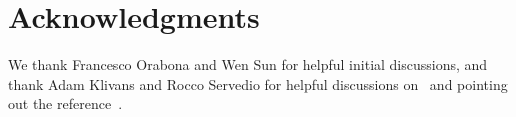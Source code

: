 \documentclass{article}
\begin{document}









%


\onecolumn
\appendix
\clearpage

\section*{Acknowledgments} We thank Francesco Orabona and Wen Sun
for helpful initial discussions, and thank Adam Klivans and Rocco Servedio for helpful
discussions on~\citep{Klivans-Servedio-2008} and
pointing out the reference~\citep{Klivans-Servedio-2004}.










\end{document}
